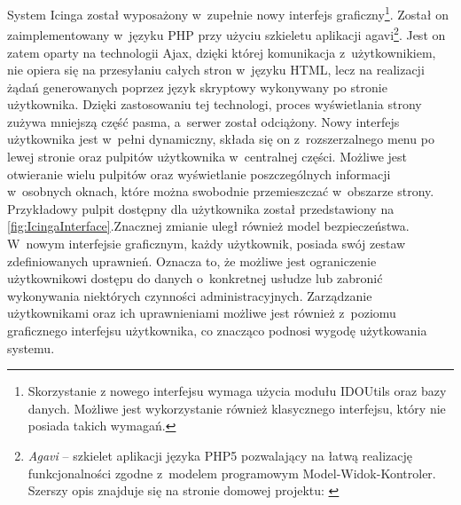 System Icinga został wyposażony w~zupełnie nowy interfejs
graficzny\footnote{Skorzystanie z nowego interfejsu wymaga użycia
  modułu IDOUtils oraz bazy danych. Możliwe jest wykorzystanie również
  klasycznego interfejsu, który nie posiada takich wymagań.}. Został
on zaimplementowany w~języku PHP przy użyciu szkieletu aplikacji
agavi\footnote{{\em Agavi } -- szkielet aplikacji języka PHP5
  pozwalający na łatwą realizację funkcjonalności zgodne z~modelem
  programowym Model-Widok-Kontroler. Szerszy opis znajduje się na
  stronie domowej projektu: \cite{www:Agavi}}. Jest on zatem oparty na
technologii Ajax, dzięki której komunikacja z~użytkownikiem, nie opiera
się na przesyłaniu całych stron w~języku HTML, lecz na realizacji
żądań generowanych poprzez język skryptowy wykonywany po stronie
użytkownika. Dzięki zastosowaniu tej technologi, proces wyświetlania
strony zużywa mniejszą część pasma, a~serwer został odciążony. Nowy
interfejs użytkownika jest w~pełni dynamiczny, składa się on
z~rozszerzalnego menu po lewej stronie oraz pulpitów użytkownika
w~centralnej części. Możliwe jest otwieranie wielu pulpitów oraz
wyświetlanie poszczególnych informacji w~osobnych oknach, które można
swobodnie przemieszczać w~obszarze strony. Przykładowy pulpit dostępny
dla użytkownika został przedstawiony na
\ref{fig:IcingaInterface}.Znacznej zmianie uległ również model
bezpieczeństwa. W~nowym interfejsie graficznym, każdy użytkownik,
posiada swój zestaw zdefiniowanych uprawnień. Oznacza to, że możliwe
jest ograniczenie użytkownikowi dostępu do danych o~konkretnej usłudze
lub zabronić wykonywania niektórych czynności
administracyjnych. Zarządzanie użytkownikami oraz ich uprawnieniami
możliwe jest również z~poziomu graficznego interfejsu użytkownika, co
znacząco podnosi wygodę użytkowania systemu.

